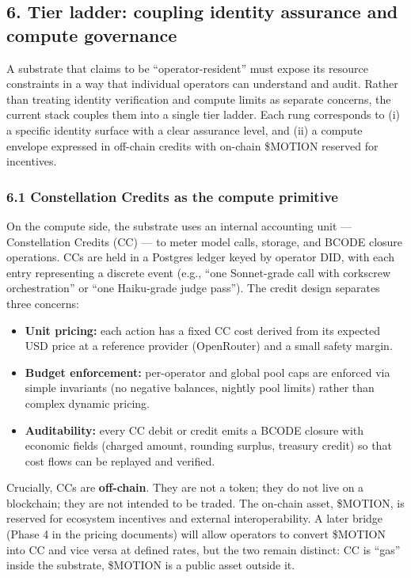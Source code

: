 \subsection{6. Tier ladder: coupling identity assurance and compute
governance}\label{tier-ladder-coupling-identity-assurance-and-compute-governance}

A substrate that claims to be ``operator-resident'' must expose its
resource constraints in a way that individual operators can understand
and audit. Rather than treating identity verification and compute limits
as separate concerns, the current stack couples them into a single tier
ladder. Each rung corresponds to (i) a specific identity surface with a
clear assurance level, and (ii) a compute envelope expressed in
off-chain credits with on-chain \$MOTION reserved for incentives.

\subsubsection{6.1 Constellation Credits as the compute
primitive}\label{constellation-credits-as-the-compute-primitive}

On the compute side, the substrate uses an internal accounting unit ---
Constellation Credits (CC) --- to meter model calls, storage, and BCODE
closure operations. CCs are held in a Postgres ledger keyed by operator
DID, with each entry representing a discrete event (e.g., ``one
Sonnet-grade call with corkscrew orchestration'' or ``one Haiku-grade
judge pass''). The credit design separates three concerns:

\begin{itemize}
\tightlist
\item
  \textbf{Unit pricing:} each action has a fixed CC cost derived from
  its expected USD price at a reference provider (OpenRouter) and a
  small safety margin.
\item
  \textbf{Budget enforcement:} per-operator and global pool caps are
  enforced via simple invariants (no negative balances, nightly pool
  limits) rather than complex dynamic pricing.
\item
  \textbf{Auditability:} every CC debit or credit emits a BCODE closure
  with economic fields (charged amount, rounding surplus, treasury
  credit) so that cost flows can be replayed and verified.
\end{itemize}

Crucially, CCs are \textbf{off-chain}. They are not a token; they do not
live on a blockchain; they are not intended to be traded. The on-chain
asset, \$MOTION, is reserved for ecosystem incentives and external
interoperability. A later bridge (Phase 4 in the pricing documents) will
allow operators to convert \$MOTION into CC and vice versa at defined
rates, but the two remain distinct: CC is ``gas'' inside the substrate,
\$MOTION is a public asset outside it.

